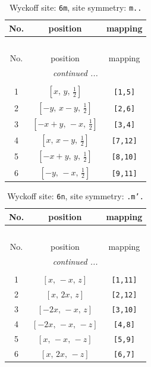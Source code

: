 \documentclass[fleqn,8pt]{jsarticle}
\begin{document}
\renewcommand{\arraystretch}{1.2}
\begin{longtable}{ccc}
\caption{Wyckoff site: {\tt 6m}, site symmetry: {\tt m..}}
 \\
 \hline \hline
No. & position & mapping \\ \hline \endfirsthead

\multicolumn{2}{l}{\tablename\ \thetable{}} \\
 \hline \hline
No. & position & mapping \\ \hline \endhead

 \hline \hline
\multicolumn{2}{r}{\footnotesize\it continued ...} \\ \endfoot

 \hline \hline
\multicolumn{2}{r}{} \\ \endlastfoot

1 & $\left[ x,\, y,\, \frac{1}{2} \right]$ & {\tt [1,5]} \\ \hline
2 & $\left[ - y,\, x - y,\, \frac{1}{2} \right]$ & {\tt [2,6]} \\ \hline
3 & $\left[ - x + y,\, - x,\, \frac{1}{2} \right]$ & {\tt [3,4]} \\ \hline
4 & $\left[ x,\, x - y,\, \frac{1}{2} \right]$ & {\tt [7,12]} \\ \hline
5 & $\left[ - x + y,\, y,\, \frac{1}{2} \right]$ & {\tt [8,10]} \\ \hline
6 & $\left[ - y,\, - x,\, \frac{1}{2} \right]$ & {\tt [9,11]} \\
\end{longtable}
\renewcommand{\arraystretch}{1.2}
\begin{longtable}{ccc}
\caption{Wyckoff site: {\tt 6n}, site symmetry: {\tt .m'.}}
 \\
 \hline \hline
No. & position & mapping \\ \hline \endfirsthead

\multicolumn{2}{l}{\tablename\ \thetable{}} \\
 \hline \hline
No. & position & mapping \\ \hline \endhead

 \hline \hline
\multicolumn{2}{r}{\footnotesize\it continued ...} \\ \endfoot

 \hline \hline
\multicolumn{2}{r}{} \\ \endlastfoot

1 & $\left[ x,\, - x,\, z \right]$ & {\tt [1,11]} \\ \hline
2 & $\left[ x,\, 2 x,\, z \right]$ & {\tt [2,12]} \\ \hline
3 & $\left[ - 2 x,\, - x,\, z \right]$ & {\tt [3,10]} \\ \hline
4 & $\left[ - 2 x,\, - x,\, - z \right]$ & {\tt [4,8]} \\ \hline
5 & $\left[ x,\, - x,\, - z \right]$ & {\tt [5,9]} \\ \hline
6 & $\left[ x,\, 2 x,\, - z \right]$ & {\tt [6,7]} \\
\end{longtable}
\end{document}
